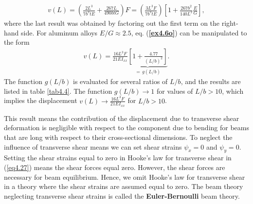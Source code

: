 \documentclass{AeroStructure-ERJohnson}
\begin{document}
\begin{example}
\begin{align}\label{ex4.6o}
v(L)=\left(\frac{2 L^{3}}{7 b^{3} t E}+\frac{267 L}{490 b t G}\right) F=\left(\frac{3 L^{3} F}{7 b^{3} t E}\right)\left[1+\frac{267 b^{2}}{140 L^{2}} \frac{E}{G}\right],
\end{align}
where the last result was obtained by factoring out the first term on the right-hand side. For aluminum alloys $E/G \approx 2.5$, eq. (\textbf{\ref{ex4.6o}}) can be manipulated to the\vspace*{-2pt} form
\begin{align}\label{ex4.6p}
v(L)=\frac{16 L^{3} F}{21 E I_{x x}} \underbrace{\left[1+\frac{4.77}{(L/b)^{2}}\right]}_{=\,g(L/b)}.
\end{align}
The function $g(L/b)$ is evaluated for several ratios of $L/b$, and the results are listed in table \ref{tab4.4}. The function $g(L/b) \rightarrow 1$ for values of $L/b>10$, which implies the displacement $v(L) \rightarrow \frac{16 L^{3} F}{21 E I_{x x}}$ for $L/b>10$.

This result means the contribution of the displacement due to transverse shear deformation is negligible with respect to the component due to bending for beams that are long with respect to their cross-sectional dimensions. To neglect the influence of transverse shear means we can set shear strains $\psi_{x}=0$ and $\psi_{y}=0$. Setting the shear strains equal to zero in Hooke's law for transverse shear in (\ref{eq4.27}) means the shear forces equal zero. However, the shear forces are necessary for beam equilibrium. Hence, we omit Hooke's law for transverse shear in a theory where the shear strains are assumed equal to zero. The beam theory neglecting transverse shear strains is called the \textbf{Euler-Bernoulli} beam theory.
\end{example}
\clearpage

\begin{table}
\end{table}
\end{document}
